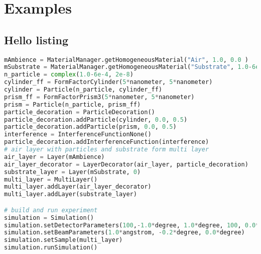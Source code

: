 \newpage
\section{Examples}


\subsection{Hello listing}

\begin{lstlisting}[language=python, style=eclipse]    
mAmbience = MaterialManager.getHomogeneousMaterial("Air", 1.0, 0.0 )
mSubstrate = MaterialManager.getHomogeneousMaterial("Substrate", 1.0-6e-6, 2e-8 )
n_particle = complex(1.0-6e-4, 2e-8)
cylinder_ff = FormFactorCylinder(5*nanometer, 5*nanometer)
cylinder = Particle(n_particle, cylinder_ff)
prism_ff = FormFactorPrism3(5*nanometer, 5*nanometer)
prism = Particle(n_particle, prism_ff)
particle_decoration = ParticleDecoration()
particle_decoration.addParticle(cylinder, 0.0, 0.5)
particle_decoration.addParticle(prism, 0.0, 0.5)
interference = InterferenceFunctionNone()
particle_decoration.addInterferenceFunction(interference)
# air layer with particles and substrate form multi layer
air_layer = Layer(mAmbience)
air_layer_decorator = LayerDecorator(air_layer, particle_decoration)
substrate_layer = Layer(mSubstrate, 0)
multi_layer = MultiLayer()
multi_layer.addLayer(air_layer_decorator)
multi_layer.addLayer(substrate_layer)

# build and run experiment
simulation = Simulation()
simulation.setDetectorParameters(100,-1.0*degree, 1.0*degree, 100, 0.0*degree 2.0*degree, True)
simulation.setBeamParameters(1.0*angstrom, -0.2*degree, 0.0*degree)
simulation.setSample(multi_layer)
simulation.runSimulation()
\end{lstlisting}

